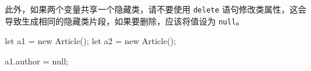此外，如果两个变量共享一个隐藏类，请不要使用 \texttt{delete} 语句修改类属性，这会导致生成相同的隐藏类片段，如果要删除，应该将值设为 \texttt{null}。

\begin{JavaScript}
let a1 = new Article();
let a2 = new Article();

a1.author = null;
\end{JavaScript}


\newpage